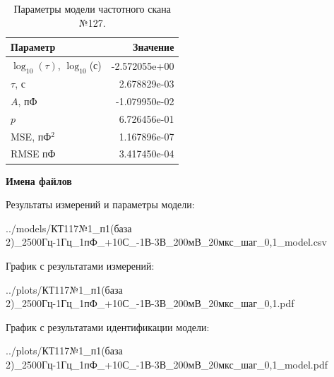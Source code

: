 \begin{table}[!ht]
    \centering
    \caption{Параметры модели частотного скана №127.}
    \begin{tabular}{|l|r|}
        \hline
        Параметр                                       & Значение                  \\ \hline
        $\log_{10}(\tau)$, $\log_{10}$(с)              & -2.572055e+00             \\ \hline
        $\tau$, с                                      & 2.678829e-03              \\ \hline
        $A$, пФ                                        & -1.079950e-02             \\ \hline
        $p$                                            & 6.726456e-01              \\ \hline
        MSE, пФ$^2$                                    & 1.167896e-07              \\ \hline
        RMSE пФ                                        & 3.417450e-04              \\ \hline
    \end{tabular}
    \label{table:frequency_scan_model_127}
\end{table}

\textbf{Имена файлов}

Результаты измерений и параметры модели:

\scriptsize../models/КТ117№1\_п1(база 2)\_2500Гц-1Гц\_1пФ\_+10С\_-1В-3В\_200мВ\_20мкс\_шаг\_0,1\_model.csv
\normalsize

График с результатами измерений:

\scriptsize../plots/КТ117№1\_п1(база 2)\_2500Гц-1Гц\_1пФ\_+10С\_-1В-3В\_200мВ\_20мкс\_шаг\_0,1.pdf
\normalsize

График с результатами идентификации модели:

\scriptsize../plots/КТ117№1\_п1(база 2)\_2500Гц-1Гц\_1пФ\_+10С\_-1В-3В\_200мВ\_20мкс\_шаг\_0,1\_model.pdf
\normalsize

